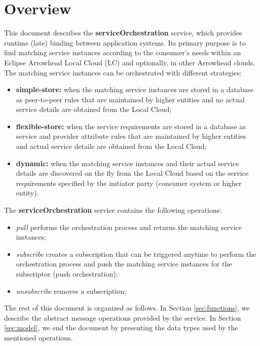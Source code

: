 \documentclass[a4paper]{arrowhead}
\begin{document}
\section{Overview}
\label{sec:overview}
This document describes the \textbf{serviceOrchestration} service, which provides runtime (late) binding between application systems. Its primary purpose is to find matching service instances according to the consumer's needs within an Eclipse Arrowhead Local Cloud (LC) and optionally, in other Arrowhead clouds. The matching service instances can be orchestrated with different strategies:

\begin{itemize}
    \item \textbf{simple-store:} when the matching service instances are stored in a database as peer-to-peer rules that are maintained by higher entities and no actual service details are obtained from the Local Cloud;
    \item \textbf{flexible-store:} when the service requirements are stored in a database as service and provider attribute rules that are maintained by higher entities and actual service details are obtained from the Local Cloud;
    \item \textbf{dynamic:} when the matching service instances and their actual service details are discovered on the fly from the Local Cloud based on the service requirements specified by the initiator party (consumer system or higher entity).
\end{itemize}


The \textbf{serviceOrchestration} service contains the following operations:

\begin{itemize}
    \item \textit{pull} performs the orchestration process and returns the matching service instances;
    \item \textit{subscribe} creates a subscription that can be triggered anytime to perform the orchestration process and push the matching service instances for the subscriptor (push orchestration);
    \item \textit{unsubscribe} removes a subscription;
\end{itemize}

The rest of this document is organized as follows.
In Section \ref{sec:functions}, we describe the abstract message operations provided by the service.
In Section \ref{sec:model}, we end the document by presenting the data types used by the mentioned operations.
\end{document}
